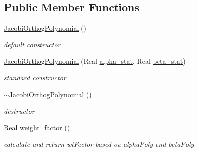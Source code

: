 \subsection*{Public Member Functions}
\begin{DoxyCompactItemize}
\item 
\hyperlink{classPecos_1_1JacobiOrthogPolynomial_ae53de420db30554be0b6b9623d78e2ae}{Jacobi\+Orthog\+Polynomial} ()\label{classPecos_1_1JacobiOrthogPolynomial_ae53de420db30554be0b6b9623d78e2ae}

\begin{DoxyCompactList}\small\item\em default constructor \end{DoxyCompactList}\item 
\hyperlink{classPecos_1_1JacobiOrthogPolynomial_a9127969c07687bdf1857dc2f6627f20c}{Jacobi\+Orthog\+Polynomial} (Real \hyperlink{classPecos_1_1JacobiOrthogPolynomial_aeeb4ce11a8d413209be1ec08eced8728}{alpha\+\_\+stat}, Real \hyperlink{classPecos_1_1JacobiOrthogPolynomial_a7f9584e538ee1574bd4d8d1afb622ed6}{beta\+\_\+stat})\label{classPecos_1_1JacobiOrthogPolynomial_a9127969c07687bdf1857dc2f6627f20c}

\begin{DoxyCompactList}\small\item\em standard constructor \end{DoxyCompactList}\item 
\hyperlink{classPecos_1_1JacobiOrthogPolynomial_a072925a371f3ffdb7bf334e3ac768a87}{$\sim$\+Jacobi\+Orthog\+Polynomial} ()\label{classPecos_1_1JacobiOrthogPolynomial_a072925a371f3ffdb7bf334e3ac768a87}

\begin{DoxyCompactList}\small\item\em destructor \end{DoxyCompactList}\item 
Real \hyperlink{classPecos_1_1JacobiOrthogPolynomial_acc5475d6b992e443e3cce753a48cfc32}{weight\+\_\+factor} ()\label{classPecos_1_1JacobiOrthogPolynomial_acc5475d6b992e443e3cce753a48cfc32}

\begin{DoxyCompactList}\small\item\em calculate and return wt\+Factor based on alpha\+Poly and beta\+Poly \end{DoxyCompactList}\end{DoxyCompactItemize}

